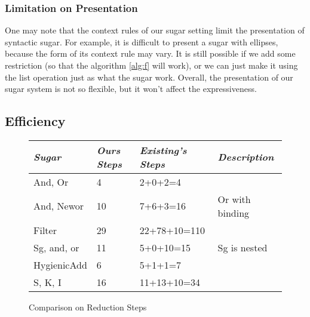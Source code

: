 \subsubsection{Limitation on Presentation}
One may note that the context rules of our sugar setting limit the presentation of syntactic sugar. For example, it is difficult to present a sugar with ellipses, because the form of its context rule may vary. It is still possible if we add some 
restriction (so that the algorithm \ref{alg:f} will work), or we can just make it using the list operation just as what the sugar  work. Overall, the presentation of our sugar system is not so flexible, but it won't affect the expressiveness. 

\subsection{Efficiency}
\begin{figure}[thb]
  \begin{center}\small
  \begin{tabular}{l | l | l |l}
    \emph{Sugar} & \emph{Ours Steps} & \emph{Existing's Steps} & \emph{Description} \\ \hline
    And, Or & 4  & 2+0+2=4 & \\
    And, Newor & 10 & 7+6+3=16 & Or with binding \\
    Filter & 29 & 22+78+10=110 &  \\
    Sg, and, or & 11 & 5+0+10=15 & Sg is nested \\ 
    HygienicAdd & 6 & 5+1+1=7 &  \\
    S, K, I & 16 & 11+13+10=34 &  \\
  \end{tabular}
  \end{center}
  \caption{Comparison on Reduction Steps}
  \label{fig:step}
  \end{figure}

